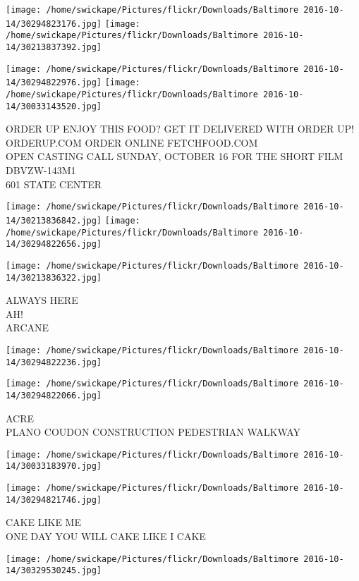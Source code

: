 \documentclass[10pt,letterpaper]{article}
\begin{document}
\texttt{[image: /home/swickape/Pictures/flickr/Downloads/Baltimore 2016-10-14/30294823176.jpg]}
\texttt{[image: /home/swickape/Pictures/flickr/Downloads/Baltimore 2016-10-14/30213837392.jpg]}

\texttt{[image: /home/swickape/Pictures/flickr/Downloads/Baltimore 2016-10-14/30294822976.jpg]}
\texttt{[image: /home/swickape/Pictures/flickr/Downloads/Baltimore 2016-10-14/30033143520.jpg]}

ORDER UP ENJOY THIS FOOD?  GET IT DELIVERED WITH ORDER UP!  ORDERUP.COM  ORDER ONLINE FETCHFOOD.COM\\
OPEN CASTING CALL SUNDAY, OCTOBER 16 FOR THE SHORT FILM\\
DBVZW{-}143M1\\
601 STATE CENTER
\pagebreak

\texttt{[image: /home/swickape/Pictures/flickr/Downloads/Baltimore 2016-10-14/30213836842.jpg]}
\texttt{[image: /home/swickape/Pictures/flickr/Downloads/Baltimore 2016-10-14/30294822656.jpg]}

\vspace{0.25in}
\texttt{[image: /home/swickape/Pictures/flickr/Downloads/Baltimore 2016-10-14/30213836322.jpg]}

ALWAYS HERE\\
AH!\\
ARCANE
\pagebreak

\texttt{[image: /home/swickape/Pictures/flickr/Downloads/Baltimore 2016-10-14/30294822236.jpg]}

\vspace{0.25in}
\texttt{[image: /home/swickape/Pictures/flickr/Downloads/Baltimore 2016-10-14/30294822066.jpg]}

ACRE\\
PLANO COUDON CONSTRUCTION PEDESTRIAN WALKWAY
\pagebreak

\texttt{[image: /home/swickape/Pictures/flickr/Downloads/Baltimore 2016-10-14/30033183970.jpg]}

\vspace{0.25in}
\texttt{[image: /home/swickape/Pictures/flickr/Downloads/Baltimore 2016-10-14/30294821746.jpg]}

CAKE LIKE ME\\
ONE DAY YOU WILL CAKE LIKE I CAKE
\pagebreak

\texttt{[image: /home/swickape/Pictures/flickr/Downloads/Baltimore 2016-10-14/30329530245.jpg]}
\end{document}
